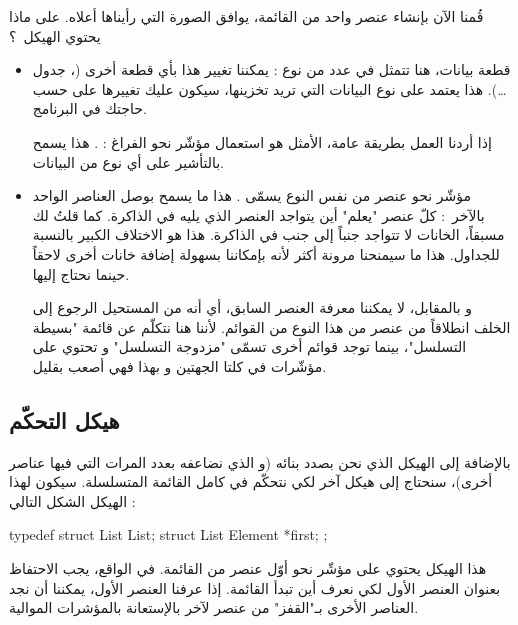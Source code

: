 قُمنا الآن بإنشاء عنصر واحد من القائمة، يوافق الصورة التي رأيناها أعلاه. على ماذا يحتوي الهيكل~؟

\begin{itemize}
	\item قطعة بيانات، هنا تتمثل في عدد من نوع 
	 :
	يمكننا تغيير هذا بأي قطعة أخرى
	(،
	جدول \dots). هذا يعتمد على نوع البيانات التي تريد تخزينها، سيكون عليك تغييرها على حسب حاجتك في البرنامج.
	
	\begin{information}
		إذا أردنا العمل بطريقة عامة، الأمثل هو استعمال مؤشّر نحو الفراغ :
		.
		هذا يسمح بالتأشير على أي نوع من البيانات.
	\end{information}
	\item مؤشّر نحو عنصر من نفس النوع يسمّى
	\InlineCode{next}.
	هذا ما يسمح بوصل العناصر الواحد بالآخر~: كلّ عنصر "يعلم" أين يتواجد العنصر الذي يليه في الذاكرة. كما قلتُ لك مسبقاً، الخانات لا تتواجد جنباً إلى جنب في الذاكرة. هذا هو الاختلاف الكبير بالنسبة للجداول. هذا ما سيمنحنا مرونة أكثر لأنه بإمكاننا بسهولة إضافة خانات أخرى لاحقاً حينما نحتاج إليها.

\begin{information}
	و بالمقابل، لا يمكننا معرفة العنصر السابق، أي أنه من المستحيل الرجوع إلى الخلف انطلاقاً من عنصر من هذا النوع من القوائم. لأننا هنا نتكلّم عن قائمة "بسيطة التسلسل"، بينما توجد قوائم أخرى تسمّى "مزدوجة التسلسل" و تحتوي على مؤشّرات في كلتا الجهتين و بهذا فهي أصعب بقليل.
\end{information}
\end{itemize}


\subsection{هيكل التحكّم}

بالإضافة إلى الهيكل الذي نحن بصدد بنائه (و الذي نضاعفه بعدد المرات التي فيها عناصر أخرى)، سنحتاج إلى هيكل آخر لكي نتحكّم في كامل القائمة المتسلسلة. سيكون لهذا الهيكل الشكل التالي :

\begin{Csource}
typedef struct List List;
struct List
{
	Element *first;
};
\end{Csource}

هذا الهيكل
يحتوي على مؤشّر نحو أوّل عنصر من القائمة. في الواقع، يجب الاحتفاظ بعنوان العنصر الأول لكي نعرف أين تبدأ القائمة. إذا عرفنا العنصر الأول، يمكننا أن نجد العناصر الأخرى بـ"القفز" من عنصر لآخر بالإستعانة بالمؤشرات الموالية.

